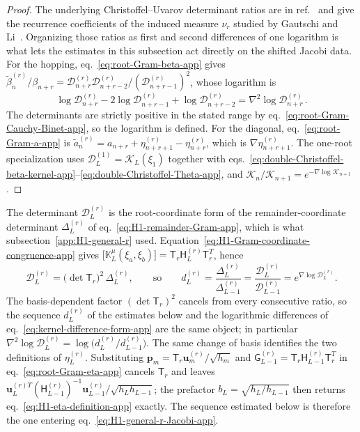 \documentclass[a4paper,11pt]{article}
\def\ee{e}%
\theoremstyle{definition}
\theoremstyle{remark}
\newcommand{\ee}{\mathrm e}
\begin{document}
\begin{proof}
The underlying Christoffel--Uvarov determinant ratios are in ref.~\cite{Uvarov1969} and give the recurrence coefficients of the induced measure $\nu_r$ studied by Gautschi and Li~\cite{GautschiLi1993}. Organizing those ratios as first and second differences of one logarithm is what lets the estimates in this subsection act directly on the shifted Jacobi data. For the hopping,
eq.~\eqref{eq:root-Gram-beta-app} gives
$\widetilde\beta_n^{(r)}/\beta_{n+r}
=\mathcal D_{n+r}^{(r)}\mathcal D_{n+r-2}^{(r)}/(\mathcal D_{n+r-1}^{(r)})^2$,
whose logarithm is
\begin{equation}
   \log\mathcal D_{n+r}^{(r)}-2\log\mathcal D_{n+r-1}^{(r)}+\log\mathcal D_{n+r-2}^{(r)}
   =\nabla^2\log\mathcal D_{n+r}^{(r)}\,.
\end{equation}
The determinants are strictly positive in the stated range
by eq.~\eqref{eq:root-Gram-Cauchy-Binet-app}, so the logarithm is defined. For the diagonal,
eq.~\eqref{eq:root-Gram-a-app} is
$\widetilde a_n^{(r)}=a_{n+r}+\eta_{n+r+1}^{(r)}-\eta_{n+r}^{(r)}$, which is $\nabla\eta_{n+r+1}^{(r)}$. The one-root specialization uses
$\mathcal D_L^{(1)}=\mathcal K_L(\xi_1)$ together with
eqs.~\eqref{eq:double-Christoffel-beta-kernel-app}--\eqref{eq:double-Christoffel-Theta-app}, and
$\mathcal K_n/\mathcal K_{n+1}=\ee^{-\nabla\log\mathcal K_{n+1}}$.
\end{proof}

The determinant $\mathcal D_L^{(r)}$ is the root-coordinate form of the remainder-coordinate
determinant $\Delta_L^{(r)}$ of eq.~\eqref{eq:H1-remainder-Gram-app}, which is what
subsection~\ref{app:H1-general-r} used.
Equation~\eqref{eq:H1-Gram-coordinate-congruence-app} gives
$\bigl[\mathbb K_L^\mu(\xi_a,\xi_b)\bigr]=\mathsf T_r\mathsf H_L^{(r)}\mathsf T_r^{T}$, hence
\begin{equation}
   \mathcal D_L^{(r)}=\bigl(\det\mathsf T_r\bigr)^2\,\Delta_L^{(r)},
   \qquad\text{so}\qquad
   d_L^{(r)}=\frac{\Delta_L^{(r)}}{\Delta_{L-1}^{(r)}}
            =\frac{\mathcal D_L^{(r)}}{\mathcal D_{L-1}^{(r)}}
            =\ee^{\nabla\log\mathcal D_L^{(r)}} .
   \label{eq:gram-hankel-reconciliation-app}
\end{equation}
The basis-dependent factor $(\det\mathsf T_r)^2$ cancels from every consecutive ratio, so the
sequence $d_L^{(r)}$ of the estimates below and the logarithmic differences of
eq.~\eqref{eq:kernel-difference-form-app} are the same object; in particular
$\nabla^2\log\mathcal D_L^{(r)}=\log\bigl(d_L^{(r)}/d_{L-1}^{(r)}\bigr)$. The same change of basis
identifies the two definitions of $\eta_L^{(r)}$. Substituting
$\boldsymbol p_m=\mathsf T_r\mathbf u_m^{(r)}/\sqrt{h_m}$ and
$\mathsf G_{L-1}^{(r)}=\mathsf T_r\mathsf H_{L-1}^{(r)}\mathsf T_r^{T}$ in
eq.~\eqref{eq:root-Gram-eta-app} cancels $\mathsf T_r$ and leaves
$\mathbf u_L^{(r)T}(\mathsf H_{L-1}^{(r)})^{-1}\mathbf u_{L-1}^{(r)}/\sqrt{h_Lh_{L-1}}$; the
prefactor $b_L=\sqrt{h_L/h_{L-1}}$ then returns
eq.~\eqref{eq:H1-eta-definition-app} exactly. The sequence estimated below is therefore the one
entering eq.~\eqref{eq:H1-general-r-Jacobi-app}.
\end{document}

